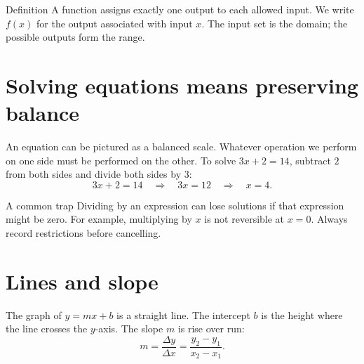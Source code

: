 \documentclass[11pt,oneside,openany]{book}
\newenvironment{definition}{\begin{conceptbox}{Definition}}{\end{conceptbox}}
\begin{document}
\begin{definition}
A function assigns exactly one output to each allowed input. We write $f(x)$ for the output associated with input $x$. The input set is the domain; the possible outputs form the range.
\end{definition}

\section{Solving equations means preserving balance}

An equation can be pictured as a balanced scale. Whatever operation we perform on one side must be performed on the other. To solve $3x+2=14$, subtract $2$ from both sides and divide both sides by $3$:
\[
  3x+2=14\quad\Longrightarrow\quad 3x=12\quad\Longrightarrow\quad x=4.
\]

\begin{center}
\end{center}

\begin{warningbox}{A common trap}
Dividing by an expression can lose solutions if that expression might be zero. For example, multiplying by $x$ is not reversible at $x=0$. Always record restrictions before cancelling.
\end{warningbox}

\section{Lines and slope}

The graph of $y=mx+b$ is a straight line. The intercept $b$ is the height where the line crosses the $y$-axis. The slope $m$ is rise over run:
\[
  m=\frac{\Delta y}{\Delta x}=\frac{y_2-y_1}{x_2-x_1}.
\]

\begin{center}
\end{center}
\end{document}

